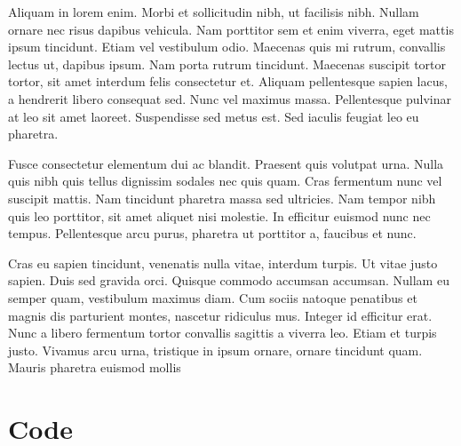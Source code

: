 \documentclass{report}
\begin{document}
            Aliquam in lorem enim. Morbi et sollicitudin nibh, ut facilisis nibh. Nullam ornare nec risus dapibus vehicula. Nam porttitor sem et enim viverra, eget mattis ipsum tincidunt. Etiam vel vestibulum odio. Maecenas quis mi rutrum, convallis lectus ut, dapibus ipsum. Nam porta rutrum tincidunt. Maecenas suscipit tortor tortor, sit amet interdum felis consectetur et. Aliquam pellentesque sapien lacus, a hendrerit libero consequat sed. Nunc vel maximus massa. Pellentesque pulvinar at leo sit amet laoreet. Suspendisse sed metus est. Sed iaculis feugiat leo eu pharetra.

            Fusce consectetur elementum dui ac blandit. Praesent quis volutpat urna. Nulla quis nibh quis tellus dignissim sodales nec quis quam. Cras fermentum nunc vel suscipit mattis. Nam tincidunt pharetra massa sed ultricies. Nam tempor nibh quis leo porttitor, sit amet aliquet nisi molestie. In efficitur euismod nunc nec tempus. Pellentesque arcu purus, pharetra ut porttitor a, faucibus et nunc.

            Cras eu sapien tincidunt, venenatis nulla vitae, interdum turpis. Ut vitae justo sapien. Duis sed gravida orci. Quisque commodo accumsan accumsan. Nullam eu semper quam, vestibulum maximus diam. Cum sociis natoque penatibus et magnis dis parturient montes, nascetur ridiculus mus. Integer id efficitur erat. Nunc a libero fermentum tortor convallis sagittis a viverra leo. Etiam et turpis justo. Vivamus arcu urna, tristique in ipsum ornare, ornare tincidunt quam. Mauris pharetra euismod mollis

    \appendix
        \chapter{Code}
\end{document}
